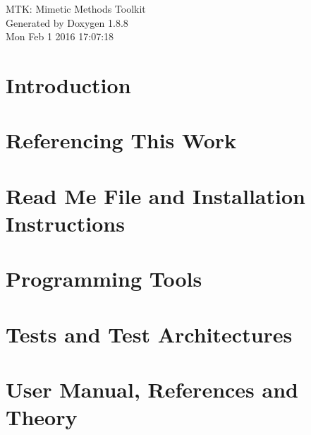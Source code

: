 \documentclass[twoside]{book}
\newcommand{\+}{\discretionary{\mbox{\scriptsize$\hookleftarrow$}}{}{}}
\newcommand{\clearemptydoublepage}{%
  \newpage{\pagestyle{empty}\cleardoublepage}%
}
\begin{document}
\hypersetup{pageanchor=false,
             bookmarks=true,
             bookmarksnumbered=true,
             pdfencoding=unicode
            }
\begin{titlepage}
\vspace*{7cm}
\begin{center}%
{\Large M\+T\+K\+: Mimetic Methods Toolkit }\\
\vspace*{1cm}
{\large Generated by Doxygen 1.8.8}\\
\vspace*{0.5cm}
{\small Mon Feb 1 2016 17:07:18}\\
\end{center}
\end{titlepage}
\clearemptydoublepage
\tableofcontents
\clearemptydoublepage
{}
\hypersetup{pageanchor=true}

\chapter{Introduction}
\label{index}\hypertarget{index}{}
\chapter{Referencing This Work}
\label{page_referencing}
\hypertarget{page_referencing}{}

\chapter{Read Me File and Installation Instructions}
\label{page_readme}
\hypertarget{page_readme}{}

\chapter{Programming Tools}
\label{section_prog_tools}
\hypertarget{section_prog_tools}{}

\chapter{Tests and Test Architectures}
\label{page_architectures}
\hypertarget{page_architectures}{}

\chapter{User Manual, References and Theory}
\label{page_ref_the}
\hypertarget{page_ref_the}{}

\end{document}
